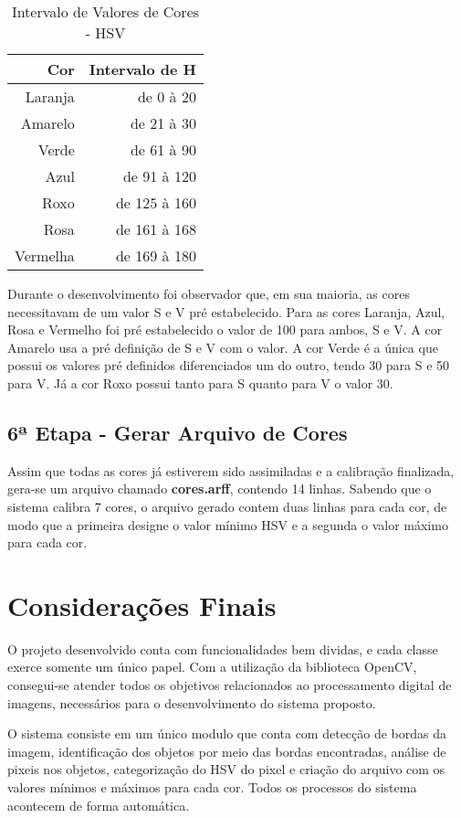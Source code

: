 \begin{table}[H]
\centering
\begin{tabular}{r|r}
Cor & Intervalo de H \\ %
\hline                               %
Laranja & de 0 à 20 \\
\hline 
Amarelo & de 21 à 30\\
\hline 
Verde & de 61 à 90 \\
\hline 
Azul& de 91 à 120 \\
\hline 
Roxo & de 125 à 160 \\
\hline 
Rosa & de 161 à 168 \\
\hline 
Vermelha & de 169 à 180 \\
\hline 
\end{tabular}
\caption{Intervalo de Valores de Cores - HSV}
\label{tab:categorias}
\end{table}

Durante o desenvolvimento foi observador que, em sua maioria, as cores necessitavam de um valor S e V pré estabelecido. Para as cores Laranja, Azul, Rosa e Vermelho foi pré estabelecido o valor de 100 para ambos, S e V. A cor Amarelo usa a pré definição de S e V com o valor. A cor Verde é a única que possui os valores pré definidos diferenciados um do outro, tendo 30 para S e 50 para V. Já a cor Roxo possui tanto para S quanto para V o valor 30.

  \subsection{6ª Etapa - Gerar Arquivo de Cores}
  Assim que todas as cores já estiverem sido assimiladas e a calibração finalizada, gera-se um arquivo chamado \textbf{cores.arff}, contendo 14 linhas. Sabendo que o sistema calibra 7 cores, o arquivo gerado contem duas linhas para cada cor, de modo que a primeira designe o valor mínimo HSV e a segunda o valor máximo para cada cor.

\section{Considerações Finais}


 O projeto desenvolvido conta com funcionalidades bem dividas, e cada classe exerce somente um único papel. Com a utilização da biblioteca OpenCV, consegui-se atender todos os objetivos relacionados ao processamento digital de imagens, necessários para o desenvolvimento do sistema proposto.

 O sistema consiste em um único modulo que conta com detecção de bordas da imagem, identificação dos objetos por meio das bordas encontradas, análise de pixeis nos objetos, categorização do HSV do pixel e criação do arquivo com os valores mínimos e máximos para cada cor. Todos os processos do sistema acontecem de forma automática.
  
 